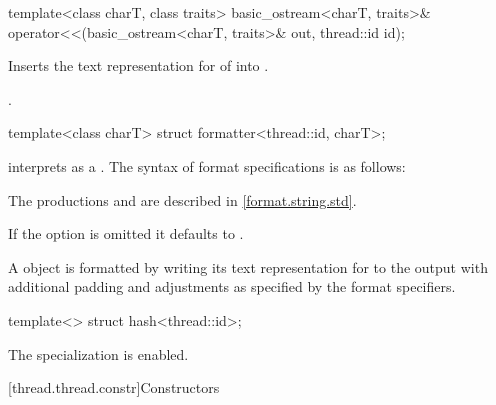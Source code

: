 %
\begin{itemdecl}
template<class charT, class traits>
  basic_ostream<charT, traits>&
    operator<<(basic_ostream<charT, traits>& out, thread::id id);
\end{itemdecl}

\begin{itemdescr}
\pnum
\effects
Inserts the text representation for  of  into
.

\pnum
\returns
{}.
\end{itemdescr}

%
\begin{itemdecl}
template<class charT> struct formatter<thread::id, charT>;
\end{itemdecl}

\begin{itemdescr}
\pnum
{} interprets 
as a .
The syntax of format specifications is as follows:

\begin{ncbnf}
\br
     
\end{ncbnf}

\begin{note}
The productions  and 
are described in \ref{format.string.std}.
\end{note}

\pnum
If the  option is omitted it defaults to \tcode{>}.

\pnum
A  object is formatted by
writing its text representation for  to the output
with additional padding and adjustments as specified by the format specifiers.
\end{itemdescr}

%
\begin{itemdecl}
template<> struct hash<thread::id>;
\end{itemdecl}

\begin{itemdescr}
\pnum
The specialization is enabled.
\end{itemdescr}

[thread.thread.constr]{Constructors}

